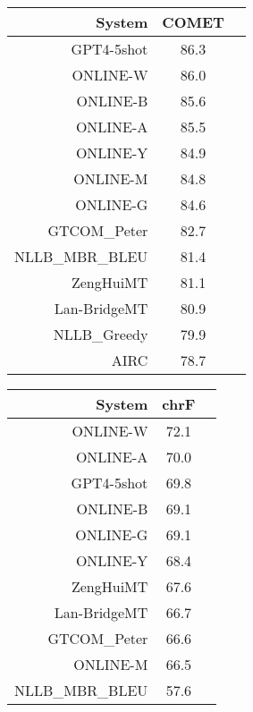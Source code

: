 \documentclass[11pt]{article}
\begin{document}
\begin{table}  
\scriptsize
\begin{subtable}[t]{0.33\textwidth}
\begin{tabular}{rcc}
\toprule 
System  & COMET \\ 
\midrule 
\rowcolor{ashgrey} GPT4-5shot   & 86.3 \\ 
\rowcolor{ashgrey} ONLINE-W   & 86.0 \\ 
\rowcolor{ashgrey} ONLINE-B   & 85.6 \\ 
\rowcolor{ashgrey} ONLINE-A  & 85.5 \\ 
\rowcolor{ashgrey} ONLINE-Y   & 84.9 \\ 
\rowcolor{ashgrey} ONLINE-M   & 84.8 \\ 
\rowcolor{ashgrey} ONLINE-G   & 84.6 \\ 
\rowcolor{ashgrey} GTCOM\_Peter   & 82.7 \\ 
\rowcolor{ashgrey} NLLB\_MBR\_BLEU   & 81.4 \\ 
\rowcolor{ashgrey} ZengHuiMT   & 81.1 \\ 
\rowcolor{ashgrey} Lan-BridgeMT   & 80.9 \\ 
\rowcolor{ashgrey} NLLB\_Greedy   & 79.9 \\ 
AIRC & 78.7 \\ 
\bottomrule 
\end{tabular} 
\end{subtable}
\begin{subtable}[t]{0.33\textwidth}
\begin{tabular}{rcc}
\toprule 
System  & chrF \\ 
\midrule 
\rowcolor{ashgrey} ONLINE-W   & 72.1 \\ 
\rowcolor{ashgrey} ONLINE-A   & 70.0 \\ 
\rowcolor{ashgrey} GPT4-5shot   & 69.8 \\ 
\rowcolor{ashgrey} ONLINE-B   & 69.1 \\ 
\rowcolor{ashgrey} ONLINE-G   & 69.1 \\ 
\rowcolor{ashgrey} ONLINE-Y   & 68.4 \\ 
\rowcolor{ashgrey} ZengHuiMT   & 67.6 \\ 
\rowcolor{ashgrey} Lan-BridgeMT   & 66.7 \\ 
\rowcolor{ashgrey} GTCOM\_Peter   & 66.6 \\ 
\rowcolor{ashgrey} ONLINE-M   & 66.5 \\ 
\rowcolor{ashgrey} NLLB\_MBR\_BLEU   & 57.6 \\ 

\end{tabular}
\end{subtable}
\end{table}
\end{document}
